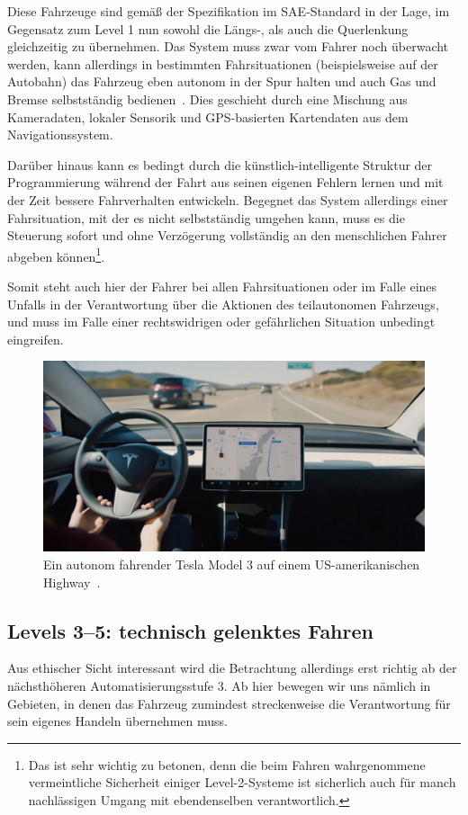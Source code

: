 \documentclass[twocolumn, german]{tum-article}
\begin{document}
\begin{description}
	Diese Fahrzeuge sind gemäß der Spezifikation im SAE-Standard in der Lage, im Gegensatz zum Level 1 nun sowohl die Längs-, als auch die Querlenkung gleichzeitig zu übernehmen.
	Das System muss zwar vom Fahrer noch überwacht werden, kann allerdings in bestimmten Fahrsituationen (beispielsweise auf der Autobahn) das Fahrzeug eben autonom in der Spur halten und auch Gas und Bremse selbstständig bedienen~\cite[S. 1]{bast-levels}.
	Dies geschieht durch eine Mischung aus Kameradaten, lokaler Sensorik und GPS-basierten Kartendaten aus dem Navigationssystem.
	
	Darüber hinaus kann es bedingt durch die künstlich-intelligente Struktur der Programmierung während der Fahrt aus seinen eigenen Fehlern lernen und mit der Zeit bessere Fahrverhalten entwickeln.
	Begegnet das System allerdings einer Fahrsituation, mit der es nicht selbstständig umgehen kann, muss es die Steuerung sofort und ohne Verzögerung vollständig an den menschlichen Fahrer abgeben können\footnote{Das ist sehr wichtig zu betonen, denn die beim Fahren wahrgenommene vermeintliche Sicherheit einiger Level-2-Systeme ist sicherlich auch für manch nachlässigen Umgang mit ebendenselben verantwortlich.}.
	
	Somit steht auch hier der Fahrer bei allen Fahrsituationen oder im Falle eines Unfalls in der Verantwortung über die Aktionen des teilautonomen Fahrzeugs, und muss im Falle einer rechtswidrigen oder gefährlichen Situation unbedingt eingreifen.
\end{description}


\begin{figure}
	\includegraphics[width=\linewidth]{media/tesla-ap-dash}
	\caption{Ein autonom fahrender Tesla Model 3 auf einem US-amerikanischen Highway~\cite{tesla-ap-dash}.}
	\label{fig:tesla-autonomous}
\end{figure}


\subsection{Levels 3--5: technisch gelenktes Fahren}
Aus ethischer Sicht interessant wird die Betrachtung allerdings erst richtig ab der nächsthöheren Automatisierungsstufe 3.
Ab hier bewegen wir uns nämlich in Gebieten, in denen das Fahrzeug zumindest streckenweise die Verantwortung für sein eigenes Handeln übernehmen muss.
\end{document}
